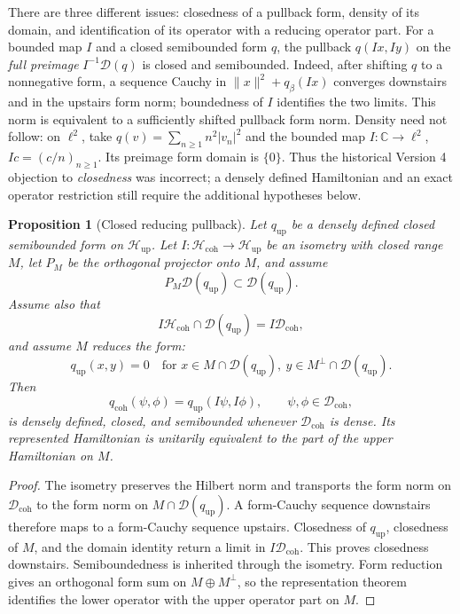 \documentclass[11pt]{article}
\newtheorem{proposition}[theorem]{Proposition}
\theoremstyle{definition}
\theoremstyle{remark}
\newcommand{\cD}{\mathcal D}
\newcommand{\cH}{\mathcal H}
\begin{document}
There are three different issues: closedness of a pullback form, density of
its domain, and identification of its operator with a reducing operator
part. For a bounded map \(I\) and a closed semibounded form \(q\), the pullback
\(q(Ix,Iy)\) on the \emph{full preimage} \(I^{-1}\mathcal D(q)\) is closed
and semibounded. Indeed, after shifting \(q\) to a nonnegative form, a
sequence Cauchy in \(\|x\|^2+q_\beta(Ix)\) converges downstairs and in the
upstairs form norm; boundedness of \(I\) identifies the two limits. This norm
is equivalent to a sufficiently shifted pullback form norm. Density need
not follow: on \(\ell^2\), take \(q(v)=\sum_{n\geq1}n^2|v_n|^2\) and the
bounded map \(I:\mathbb C\to\ell^2\), \(Ic=(c/n)_{n\geq1}\). Its preimage
form domain is \(\{0\}\). Thus the historical Version 4 objection to
\emph{closedness} was incorrect; a densely defined Hamiltonian and an exact
operator restriction still require the additional hypotheses below.
\label{sec:pullback-correction}

\begin{proposition}[Closed reducing pullback]
\label{prop:closed-pullback}
Let \(q_{\mathrm{up}}\) be a densely defined closed semibounded form on
\(\cH_{\mathrm{up}}\).  Let
\(I\colon\cH_{\mathrm{coh}}\to\cH_{\mathrm{up}}\) be an isometry with closed
range \(M\), let \(P_M\) be the orthogonal projector onto \(M\), and assume
\[
P_M\cD(q_{\mathrm{up}})\subset\cD(q_{\mathrm{up}}).
\]
Assume also that
\[
I\cH_{\mathrm{coh}}\cap\cD(q_{\mathrm{up}})
=I\cD_{\mathrm{coh}},
\]
and assume \(M\) reduces the form:
\[
q_{\mathrm{up}}(x,y)=0
\quad
\text{for }
x\in M\cap\cD(q_{\mathrm{up}}),\
y\in M^\perp\cap\cD(q_{\mathrm{up}}).
\]
Then
\[
q_{\mathrm{coh}}(\psi,\phi)
=q_{\mathrm{up}}(I\psi,I\phi),
\qquad
\psi,\phi\in\cD_{\mathrm{coh}},
\]
is densely defined, closed, and semibounded whenever
\(\cD_{\mathrm{coh}}\) is dense.  Its represented Hamiltonian is unitarily
equivalent to the part of the upper Hamiltonian on \(M\).
\end{proposition}

\begin{proof}
The isometry preserves the Hilbert norm and transports the form norm on
\(\cD_{\mathrm{coh}}\) to the form norm on
\(M\cap\cD(q_{\mathrm{up}})\).  A form-Cauchy sequence downstairs therefore
maps to a form-Cauchy sequence upstairs.  Closedness of
\(q_{\mathrm{up}}\), closedness of \(M\), and the domain identity return a
limit in \(I\cD_{\mathrm{coh}}\).  This proves closedness downstairs.
Semiboundedness is inherited through the isometry.  Form reduction gives an
orthogonal form sum on \(M\oplus M^\perp\), so the representation theorem
identifies the lower operator with the upper operator part on \(M\).
\end{proof}
\end{document}

